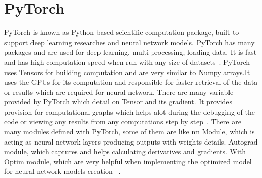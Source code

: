 \section{PyTorch}

PyTorch is known as Python based scientific computation package, built to 
support deep learning researches and neural network models.
PyTorch has many packages and are used for deep learning, multi processing,
loading data. It is fast and has high computation speed when run with any 
size of datasets~\cite{hid-sp18-520-PyTorch}.
PyTorch uses Tensors for building computation and are very similar to 
Numpy arrays.It uses the GPUs for its computation and responsible for faster 
retrieval of the data or results which are required for neural network.
 There are many variable provided by PyTorch which detail on Tensor and 
its gradient. It provides provision for computational graphs which helps 
alot during the debugging of the code or viewing any results from any 
computations step by step~\cite{hid-sp18-520-PyTorchgrad}.
There are many modules defined with PyTorch, some of them are like 
nn Module, which is acting as neural network layers producing outputs 
with weights details. Autograd module, which captures and helps calculating 
derivatives and gradients. With Optim module, which are very helpful when
implementing the optimized model for neural network models creation
~\cite{hid-sp18-520-PyTorchtensor}.
